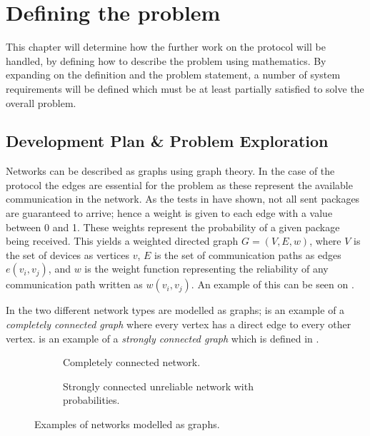 \chapter{Defining the problem}
This chapter will determine how the further work on the protocol will be handled, by defining how to describe the problem using mathematics. 
By expanding on the definition and the problem statement, a number of system requirements will be defined which must be at least partially satisfied to solve the overall problem.

\section{Development Plan \& Problem Exploration}\label{chp:Problems}
Networks can be described as graphs using graph theory. 
In the case of the protocol the edges are essential for the problem as these represent the available communication in the network.
As the tests in  have shown, not all sent packages are guaranteed to arrive; hence a weight is given to each edge with a value between 0 and 1.
These weights represent the probability of a given package being received.
This yields a weighted directed graph $G = (V, E, w)$, where $V$ is the set of devices as vertices $v$, $E$ is the set of communication paths as edges $e(v_i, v_j)$, and $w$ is the weight function representing the reliability of any communication path written as $w(v_i,v_j)$. 
An example of this can be seen on .

In  the two different network types are modelled as graphs; 
 is an example of a \emph{completely connected graph} where every vertex has a direct edge to every other vertex. 
 is an example of a \emph{strongly connected graph} which is defined in .

\begin{figure}[H]
    \footnotesize
    \begin{subfigure}{0.5\linewidth}
        \centering
        
        \caption{Completely connected network.}
        \label{fig:ccrcnetworkgraph}
    \end{subfigure}\hfill
    \begin{subfigure}{0.5\linewidth}
        \centering
        
        \caption{Strongly connected unreliable network with probabilities.}
        \label{fig:network}
    \end{subfigure}
    \caption{Examples of networks modelled as graphs.}
    \label{fig:examplenetworkgraphs}
    \vspace{-20pt}
\end{figure}

